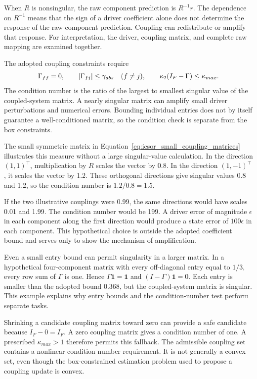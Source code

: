 When \(R\) is nonsingular, the raw component prediction is \(R^{-1}r\). The dependence on \(R^{-1}\) means that the sign of a driver coefficient alone does not determine the response of the raw component prediction. Coupling can redistribute or amplify that response. For interpretation, the driver, coupling matrix, and complete raw mapping are examined together.

The adopted coupling constraints require
\begin{equation}
\equationname{Diagonal, magnitude, and conditioning safeguards for component coupling}
\label{eq:icsor_coupling_safeguards}
\Gamma_{ff}=0,
\qquad |\Gamma_{fj}|\leq\gamma_{abs}\quad(f\neq j),
\qquad \kappa_2(I_F-\Gamma)\leq\kappa_{max}.
\end{equation}
The condition number is the ratio of the largest to smallest singular value of the coupled-system matrix. A nearly singular matrix can amplify small driver perturbations and numerical errors. Bounding individual entries does not by itself guarantee a well-conditioned matrix, so the condition check is separate from the box constraints.

The small symmetric matrix in Equation~\eqref{eq:icsor_small_coupling_matrices} illustrates this measure without a large singular-value calculation. In the direction \((1,1)^\top\), multiplication by \(R\) scales the vector by 0.8. In the direction \((1,-1)^\top\), it scales the vector by 1.2. These orthogonal directions give singular values 0.8 and 1.2, so the condition number is \(1.2/0.8=1.5\).

If the two illustrative couplings were 0.99, the same directions would have scales 0.01 and 1.99. The condition number would be 199. A driver error of magnitude \(\epsilon\) in each component along the first direction would produce a state error of \(100\epsilon\) in each component. This hypothetical choice is outside the adopted coefficient bound and serves only to show the mechanism of amplification.

Even a small entry bound can permit singularity in a larger matrix. In a hypothetical four-component matrix with every off-diagonal entry equal to \(1/3\), every row sum of \(\Gamma\) is one. Hence \(\Gamma\mathbf{1}=\mathbf{1}\) and \((I-\Gamma)\mathbf{1}=0\). Each entry is smaller than the adopted bound 0.368, but the coupled-system matrix is singular. This example explains why entry bounds and the condition-number test perform separate tasks.

Shrinking a candidate coupling matrix toward zero can provide a safe candidate because \(I_F-0=I_F\). A zero coupling matrix gives a condition number of one. A prescribed \(\kappa_{max}>1\) therefore permits this fallback. The admissible coupling set contains a nonlinear condition-number requirement. It is not generally a convex set, even though the box-constrained estimation problem used to propose a coupling update is convex.

